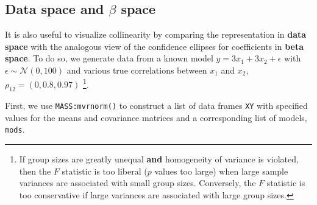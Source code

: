 \documentclass[
  letterpaper,
  10pt,
  krantz2]{krantz}
\begin{document}
\subsection{\texorpdfstring{Data space and \(\beta\)
space}{Data space and \textbackslash beta space}}\label{data-space-and-beta-space}

It is also useful to visualize collinearity by comparing the
representation in \textbf{data space} with the analogous view of the
confidence ellipses for coefficients in \textbf{beta space}. To do so,
we generate data from a known model \(y = 3 x_1 + 3 x_2 + \epsilon\)
with \(\epsilon \sim \mathcal{N} (0, 100)\) and various true
correlations between \(x_1\) and \(x_2\), \(\rho_{12} = (0, 0.8, 0.97)\)
\footnote{If group sizes are greatly unequal \textbf{and} homogeneity of
  variance is violated, then the \(F\) statistic is too liberal (\(p\)
  values too large) when large sample variances are associated with
  small group sizes. Conversely, the \(F\) statistic is too conservative
  if large variances are associated with large group sizes.}.


First, we use \texttt{MASS:mvrnorm()} to construct a list of data frames
\texttt{XY} with specified values for the means and covariance matrices
and a corresponding list of models, \texttt{mods}.
\end{document}
